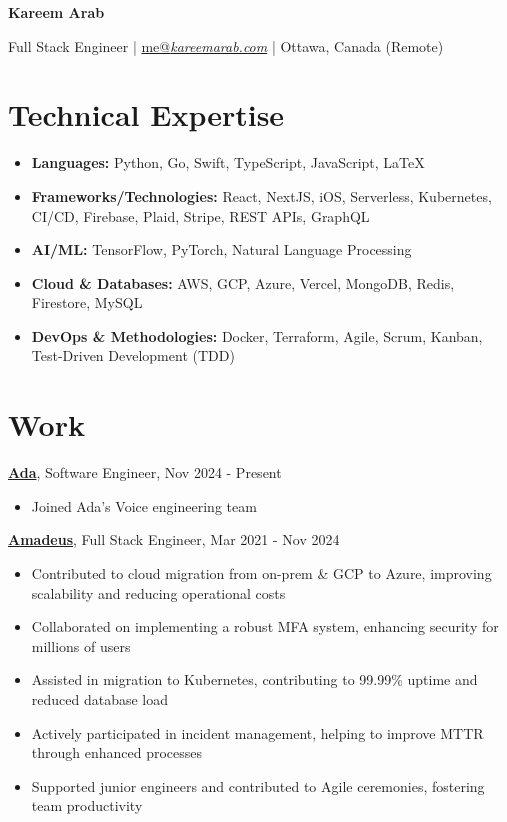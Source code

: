 \documentclass[9pt]{article}
\begin{document}
\begin{center}
    {\LARGE \textbf{Kareem Arab}}\par\smallskip
    Full Stack Engineer | \href{mailto:me@kareemarab.com}{me@\textit{kareemarab.com}} | Ottawa, Canada (Remote)
\end{center}

\section*{Technical Expertise}
\begin{itemize}
    \setlength\itemsep{0em}
    \item \textbf{Languages:} Python, Go, Swift, TypeScript, JavaScript, \LaTeX
    \item \textbf{Frameworks/Technologies:} React, NextJS, iOS, Serverless, Kubernetes, CI/CD, Firebase, Plaid, Stripe, REST APIs, GraphQL
    \item \textbf{AI/ML:} TensorFlow, PyTorch, Natural Language Processing
    \item \textbf{Cloud \& Databases:} AWS, GCP, Azure, Vercel, MongoDB, Redis, Firestore, MySQL
    \item \textbf{DevOps \& Methodologies:} Docker, Terraform, Agile, Scrum, Kanban, Test-Driven Development (TDD)
\end{itemize}

\section*{Work}

\noindent
\textbf{\href{https://ada.cx}{Ada}}, Software Engineer, Nov 2024 - Present
\begin{itemize}
    \setlength\itemsep{0em}
    \item Joined Ada's Voice engineering team
\end{itemize}

\noindent
\textbf{\href{https://amadeus.com/en}{Amadeus}}, Full Stack Engineer, Mar 2021 - Nov 2024
\begin{itemize}
    \setlength\itemsep{0em}
    \item Contributed to cloud migration from on-prem \& GCP to Azure, improving scalability and reducing operational costs
    \item Collaborated on implementing a robust MFA system, enhancing security for millions of users
    \item Assisted in migration to Kubernetes, contributing to 99.99\% uptime and reduced database load
    \item Actively participated in incident management, helping to improve MTTR through enhanced processes
    \item Supported junior engineers and contributed to Agile ceremonies, fostering team productivity
\end{itemize}
\end{document}
